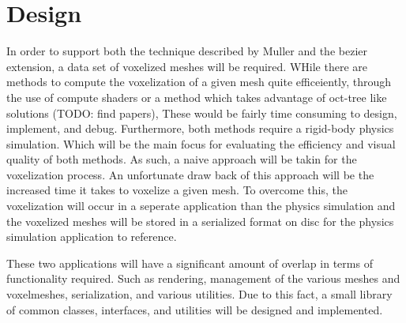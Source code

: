 \chapter{Design}



In order to support both the technique described by Muller \etal and the bezier extension, a data 
set of voxelized meshes will be required. WHile there are methods to compute the voxelization of a 
given mesh quite efficeiently, through the use of compute shaders or a method which takes advantage 
of oct-tree like solutions (TODO: find papers), These would be fairly time consuming to design, 
implement, and debug. Furthermore, both methods require a rigid-body physics simulation. Which will 
be the main focus for evaluating the efficiency and visual quality of both methods. As such, a 
naive approach will be takin for the voxelization process. An unfortunate draw back of this approach
will be the increased time it takes to voxelize a given mesh. To overcome this, the voxelization
will occur in a seperate application than the physics simulation and the voxelized meshes will be 
stored in a serialized format on disc for the physics simulation application to reference.

These two applications will have a significant amount of overlap in terms of functionality required.
Such as rendering, management of the various meshes and voxelmeshes, serialization, and various 
utilities. Due to this fact, a small library of common classes, interfaces, and utilities will be 
designed and implemented.

